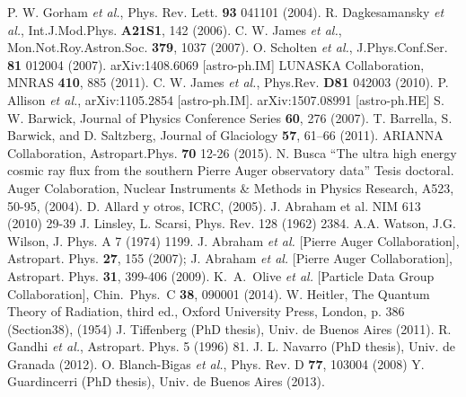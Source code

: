 \begin{thebibliography}{1}
  P. W. Gorham {\it et al.},  Phys. Rev. Lett. \textbf{93}  041101 (2004).
 R. Dagkesamansky {\it et al.}, Int.J.Mod.Phys. \textbf{A21S1},  142 (2006).
 C. W. James {\it et al.}, Mon.Not.Roy.Astron.Soc. \textbf{379}, 1037 (2007).
  O. Scholten {\it et al.}, J.Phys.Conf.Ser. \textbf{81}  012004 (2007).
 arXiv:1408.6069 [astro-ph.IM]
 LUNASKA Collaboration, MNRAS \textbf{410}, 885 (2011).
  C. W. James {\it et al.}, Phys.Rev. \textbf{D81}  042003 (2010).
 P. Allison {\it et al.}, arXiv:1105.2854 [astro-ph.IM].
 arXiv:1507.08991 [astro-ph.HE]
 S. W. Barwick, Journal of Physics Conference Series \textbf{60}, 276 (2007).
  T. Barrella, S. Barwick, and D. Saltzberg, Journal of Glaciology \textbf{57}, 61–66 (2011).
 ARIANNA Collaboration, Astropart.Phys. \textbf{70} 12-26 (2015).
 N. Busca ``The ultra high energy cosmic ray flux from the southern Pierre Auger observatory data'' Tesis doctoral.
 Auger Colaboration, Nuclear Instruments \& Methods in Physics Research, A523, 50-95, (2004).
 D. Allard y otros, ICRC, (2005).
 J. Abraham et al. NIM 613 (2010) 29-39
 J. Linsley, L. Scarsi, Phys. Rev. 128 (1962) 2384.
 A.A. Watson, J.G. Wilson, J. Phys. A 7 (1974) 1199.
 J. Abraham {\it et al.} [Pierre Auger Collaboration], Astropart. Phys. \textbf{27}, 155 (2007); J. Abraham {\it et al.} [Pierre Auger Collaboration], Astropart. Phys. {\bf 31}, 399-406 (2009).
 K.~A.~Olive {\it et al.}  [Particle Data Group Collaboration], Chin.\ Phys.\ C {\bf 38}, 090001 (2014).
 W. Heitler, The Quantum Theory of Radiation, third ed., Oxford University Press, London, p. 386 (Section38), (1954)
 J. Tiffenberg (PhD thesis), Univ. de Buenos Aires (2011).
 R. Gandhi {\it et al.}, Astropart. Phys. 5 (1996) 81.
 J. L. Navarro (PhD thesis), Univ. de Granada (2012).
 O. Blanch-Bigas {\it et al.}, Phys. Rev. D \textbf{77}, 103004 (2008)
 Y. Guardincerri (PhD thesis), Univ. de Buenos Aires (2013).

\end{thebibliography}

